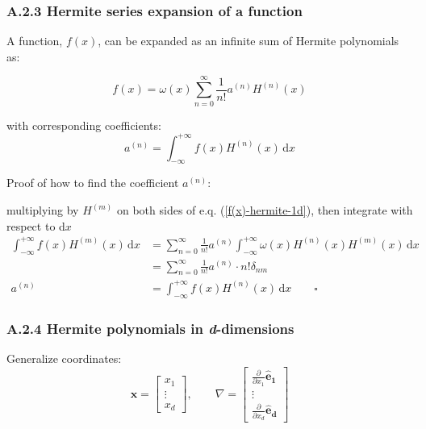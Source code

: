 \documentclass[draft]{article}
\begin{document}
\vspace*{0.5cm}
\subsubsection*{\large A.2.3 Hermite series expansion of a function}

A function, $f(x)$, can be expanded as an infinite sum of Hermite polynomials as:

\begin{equation}
	f(x) = \omega(x) \sum_{n=0}^{\infty} \frac{1}{n!} a^{(n)} H^{(n)} (x) \label{f(x)-hermite-1d}
\end{equation}

with corresponding coefficients:
\begin{equation}
	a^{(n)} = \int_{-\infty}^{+\infty} f(x) H^{(n)}(x) \, \text{d}x
\end{equation}

Proof of how to find the coefficient $a^{(n)}$:


multiplying by $H^{(m)}$ on both sides of e.q. (\ref{f(x)-hermite-1d}), then integrate with respect to d$x$
\begin{align*}
    \int_{-\infty}^{+\infty} f(x) H^{(m)}(x) \, \text{d}x &= \sum_{n=0}^{\infty} \frac{1}{n!} a^{(n)} \int_{-\infty}^{+\infty} \omega(x) H^{(n)}(x) H^{(m)}(x) \, \text{d}x \\
                                                          &= \sum_{n=0}^{\infty} \frac{1}{n!} a^{(n)} \cdot n! \delta_{nm} \\
                                                  a^{(n)} &= \int_{-\infty}^{+\infty} f(x) H^{(n)}(x) \, \text{d}x \qquad \square
\end{align*}

\clearpage

\subsubsection*{\large A.2.4 Hermite polynomials in \textit{d}-dimensions}
Generalize coordinates:
$$
\bm{x} = \begin{bmatrix}
	x_1 \\
	\vdots \\
	x_d
\end{bmatrix}
,\qquad
\nabla = \begin{bmatrix}
	{\frac{\partial}{\partial x_1} \bm{\hat{e}_1}} \\
	\vdots \\
	{\frac{\partial}{\partial x_d} \bm{\hat{e}_d}} 
\end{bmatrix}
$$
\end{document}
